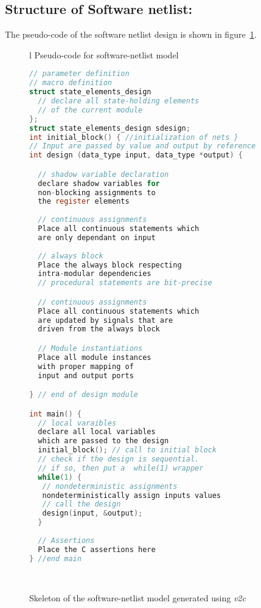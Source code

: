 \subsection{Structure of Software netlist:} The pseudo-code of the software 
netlist design is shown in figure~\ref{figure:structure}.
%
\begin{figure}[t]
\captionsetup{justification=justified}
\scriptsize
\begin{tabular}{l}
\hline
 Pseudo-code for software-netlist model \\
\hline
\begin{lstlisting}[mathescape=true,language=C]
// parameter definition
// macro definition
struct state_elements_design
  // declare all state-holding elements
  // of the current module 
};
struct state_elements_design sdesign;
int initial_block() { //initialization of nets }
// Input are passed by value and output by reference
int design (data_type input, data_type *output) {

  // shadow variable declaration
  declare shadow variables for 
  non-blocking assignments to 
  the register elements  
  
  // continuous assignments
  Place all continuous statements which 
  are only dependant on input
 
  // always block 
  Place the always block respecting
  intra-modular dependencies
  // procedural statements are bit-precise

  // continuous assignments
  Place all continuous statements which 
  are updated by signals that are 
  driven from the always block

  // Module instantiations 
  Place all module instances 
  with proper mapping of 
  input and output ports

} // end of design module

int main() {
  // local varaibles 
  declare all local variables 
  which are passed to the design 
  initial_block(); // call to initial block
  // check if the design is sequential.
  // if so, then put a  while(1) wrapper
  while(1) {
   // nondeterministic assignments
   nondeterministically assign inputs values  
   // call the design
   design(input, &output);
  }
 
  // Assertions 
  Place the C assertions here 
} //end main 
\end{lstlisting}
\\
\hline
\end{tabular}
\caption{Skeleton of the software-netlist model generated using \emph{v2c}}
\label{figure:structure}
\end{figure}
%
